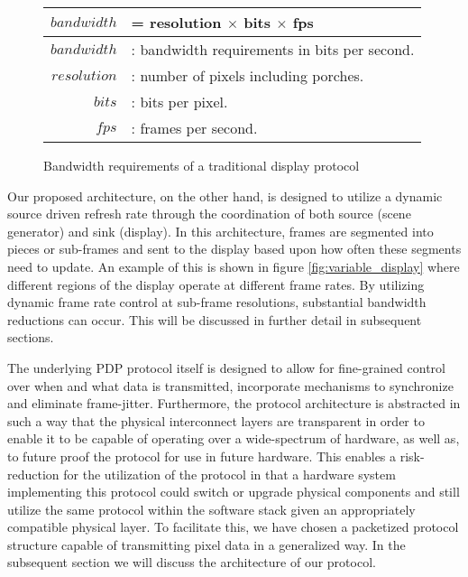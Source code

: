 \begin{figure}
    \centering
    \large
    \begin{tabular}{| r l |}
        \hline
        $$bandwidth$$ & = resolution $\times$ bits $\times$ fps \\ \hline
        $bandwidth$ & : bandwidth requirements in bits per second. \\
        $resolution$ & : number of pixels including porches. \\
        $bits$ & : bits per pixel. \\
        $fps$ & : frames per second. \\
        \hline
    \end{tabular}
    \caption{Bandwidth requirements of a traditional display protocol}
    \label{fig:bandwidth}
\end{figure}

Our proposed architecture, on the other hand, is designed to utilize a dynamic source driven refresh rate through the coordination of both source (scene generator) and sink (display). In this architecture, frames are segmented into pieces or sub-frames and sent to the display based upon how often these segments need to update. An example of this is shown in figure \ref{fig:variable_display} where different regions of the display operate at different frame rates. By utilizing dynamic frame rate control at sub-frame resolutions, substantial bandwidth reductions can occur. This will be discussed in further detail in subsequent sections.

The underlying PDP protocol itself is designed to allow for fine-grained control over when and what data is transmitted, incorporate mechanisms to synchronize and eliminate frame-jitter. Furthermore, the protocol architecture is abstracted in such a way that the physical interconnect layers are transparent in order to enable it to be capable of operating over a wide-spectrum of hardware, as well as, to future proof the protocol for use in future hardware. This enables a risk-reduction for the utilization of the protocol in that a hardware system implementing this protocol could switch or upgrade physical components and still utilize the same protocol within the software stack given an appropriately compatible physical layer. To facilitate this, we have chosen a packetized protocol structure capable of transmitting pixel data in a generalized way. In the subsequent section we will discuss the architecture of our protocol.
